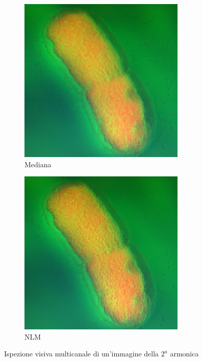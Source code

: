 \documentclass[../main.tex]{subfiles}
\begin{document}
\begin{figure}[h]
\begin{subfigure}{0.32\linewidth}
		\includegraphics[keepaspectratio, width=\linewidth]{images/multi_med.png}
		\caption{Mediana}
	\end{subfigure}
	\begin{subfigure}{0.32\linewidth}
		\centering
		\includegraphics[keepaspectratio, width=\linewidth]{images/multi_nlm.png}
		\caption{NLM}
	\end{subfigure}
	\caption{Ispezione visiva multicanale di un'immagine della $2^a$ armonica}
	\label{fig:multichannel}
\end{figure} 
\end{document}
